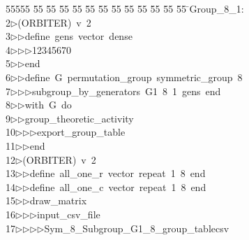 %
%
\begin{tabbing}
55555 \= 55 \= 55 \= 55 \= 55 \= 55 \= 55 \= 55 \= 55 \= 55 \= 55 \= 55 \= 55 \= \>Group\_8\_1:\\[0pt]
2\>$\triangleright$\>(ORBITER)\ v\ 2\ \\[0pt]
3\>$\triangleright$\>$\triangleright$\>define\ gens\ vector\ dense\ \\[0pt]
4\>$\triangleright$\>$\triangleright$\>$\triangleright$\>12345670\ \\[0pt]
5\>$\triangleright$\>$\triangleright$\>end\ \\[0pt]
6\>$\triangleright$\>$\triangleright$\>define\ G\ permutation\_group\ symmetric\_group\ 8\ \\[0pt]
7\>$\triangleright$\>$\triangleright$\>$\triangleright$\>subgroup\_by\_generators\ G1\ 8\ 1\ gens\ end\ \\[0pt]
8\>$\triangleright$\>$\triangleright$\>with\ G\ do\ \\[0pt]
9\>$\triangleright$\>$\triangleright$\>group\_theoretic\_activity\ \\[0pt]
10\>$\triangleright$\>$\triangleright$\>$\triangleright$\>export\_group\_table\ \\[0pt]
11\>$\triangleright$\>$\triangleright$\>end\\[0pt]
12\>$\triangleright$\>(ORBITER)\ v\ 2\ \\[0pt]
13\>$\triangleright$\>$\triangleright$\>define\ all\_one\_r\ vector\ repeat\ 1\ 8\ end\ \\[0pt]
14\>$\triangleright$\>$\triangleright$\>define\ all\_one\_c\ vector\ repeat\ 1\ 8\ end\ \\[0pt]
15\>$\triangleright$\>$\triangleright$\>draw\_matrix\ \\[0pt]
16\>$\triangleright$\>$\triangleright$\>$\triangleright$\>input\_csv\_file\ \\[0pt]
17\>$\triangleright$\>$\triangleright$\>$\triangleright$\>$\triangleright$\>Sym\_8\_Subgroup\_G1\_8\_group\_tablecsv\ \\[0pt]

\end{tabbing}
